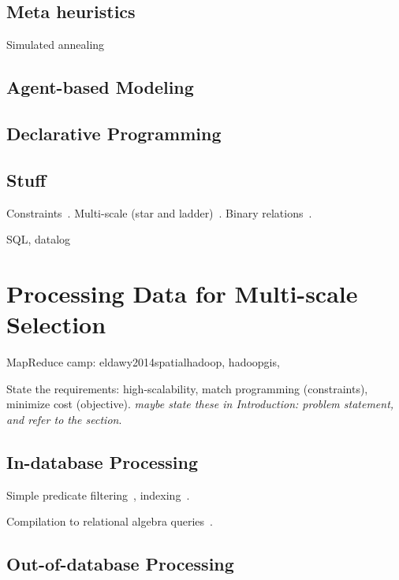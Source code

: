 \documentclass[11pt, oneside]{report}
\begin{document}
{\subsection{Meta heuristics}

Simulated annealing~\cite{ware2003generalization_sa}

\subsection{Agent-based Modeling}

\subsection{Declarative Programming}

\subsection{Stuff}

Constraints~\cite{harrie1999constraint, woodruff1998constant, topfer1966principles, sarma2012fusiontables, nutanong2012multiresolution}.
Multi-scale (star and ladder)~\cite{foerster2010challenges, sarma2012fusiontables}.
Binary relations~\cite{egenhofer1991categorizing, randell1992spatial}. 

SQL, datalog


\section{Processing Data for Multi-scale Selection}
\label{related:work:processing}

MapReduce camp: eldawy2014spatialhadoop, hadoopgis, 

State the requirements: high-scalability, match programming (constraints), minimize cost (objective).
\emph{maybe state these in Introduction: problem statement, and refer to the section}.

\subsection{In-database Processing}

Simple predicate filtering~\cite{vizzuality2012cartodb}, indexing~\cite{nutanong2012multiresolution, van1995gap}.

Compilation to relational algebra queries~\cite{wu2014case, battle2013scalar, boncz2006monetdb, grust2009ferry}.

\subsection{Out-of-database Processing}

}
\end{document}
